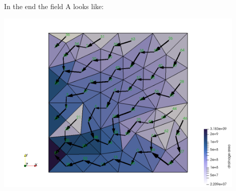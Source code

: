 In the end the field A looks like:
\begin{center}
\includegraphics[width=12cm]{python_codes/fieldstone_140/images/mesh8}
\end{center}















